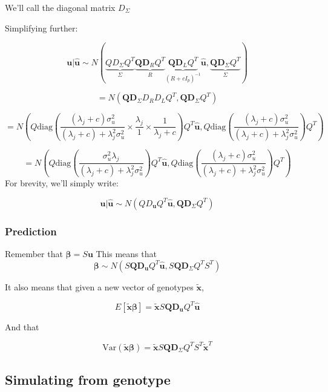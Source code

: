 {We'll call the diagonal matrix \(D_\Sigma\)

Simplifying further:

$$\textbf{u}|\hat{\textbf{u}} \sim N(\underbrace{Q D_\Sigma Q^{T}}_\Sigma \underbrace{\textbf{Q}\textbf{D}_{R}Q^{T}}_R \underbrace{\textbf{Q}\textbf{D}_LQ^{T}}_{(R+cI_p)^{-1}}\hat{\textbf{u}},\underbrace{\textbf{Q}\textbf{D}_\Sigma Q^{T}}_\Sigma)$$

$$= N(\textbf{Q}\textbf{D}_\Sigma D_R D_LQ^{T},\textbf{Q}\textbf{D}_\Sigma Q^{T})$$

$$= N\left( Q \text{diag}\left( \frac{(\lambda_j+c)\sigma_u^2}{(\lambda_j+c)+\lambda_j^2\sigma_u^2} \times \frac{\lambda_j}{1} \times \frac{1}{\lambda_j+c} \right)Q^{T}\hat{\textbf{u}},Q \text{diag}\left(\frac{(\lambda_j+c)\sigma_u^2}{(\lambda_j+c)+\lambda_j^2\sigma_u^2} \right)Q^{T} \right)$$

$$= N\left( Q \text{diag}\left( \frac{\sigma_u^2 \lambda_j}{(\lambda_j+c)+\lambda_j^2\sigma_u^2}  \right)Q^{T}\hat{\textbf{u}},Q \text{diag}\left(\frac{(\lambda_j+c)\sigma_u^2}{(\lambda_j+c)+\lambda_j^2\sigma_u^2} \right)Q^{T} \right)$$
For brevity, we'll simply write:

$$\textbf{u}|\hat{\textbf{u}} \sim N \left(Q D_{\textbf{u}}Q^{T}\hat{\textbf{u}},\textbf{Q}\textbf{D}_{\Sigma}Q^{T}\right)$$




\subsubsection{Prediction}\label{sec:org8cfb0b1}

Remember that \(\boldsymbol{\beta}=S\textbf{u}\) This means that 
$$\boldsymbol{\beta} \sim N( S\textbf{Q}\textbf{D}_{\textbf{u}}Q^{T}\hat{\textbf{u}},S\textbf{Q}\textbf{D}_\Sigma Q^{T}S^{T})$$

It also means that given a new vector of genotypes \(\tilde{\textbf{x}}\),

$$E[\tilde{\textbf{x}}\boldsymbol{\beta}]=\tilde{\textbf{x}}S\textbf{Q}\textbf{D}_\textbf{u}Q^{T}\hat{\textbf{u}}$$

And that 

$$\text{Var}(\tilde{\textbf{x}}\boldsymbol{\beta})=\tilde{\textbf{x}}S\textbf{Q}\textbf{D}_\Sigma Q^{T}S^{T}\tilde{\textbf{x}}^{T}$$








\subsection{Simulating from genotype}\label{sec:orgaeeeb37}

}
